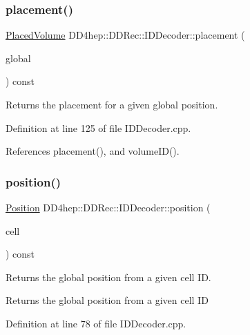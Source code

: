 \subsubsection{\texorpdfstring{placement()}{placement()}\hspace{0.1cm}{\footnotesize\ttfamily [2/2]}}
{\footnotesize\ttfamily \hyperlink{class_d_d4hep_1_1_geometry_1_1_placed_volume}{Placed\+Volume} D\+D4hep\+::\+D\+D\+Rec\+::\+I\+D\+Decoder\+::placement (\begin{DoxyParamCaption}\item[{const \hyperlink{namespace_d_d4hep_1_1_geometry_a55083902099d03506c6db01b80404900}{Geometry\+::\+Position} \&}]{global }\end{DoxyParamCaption}) const}



Returns the placement for a given global position. 



Definition at line 125 of file I\+D\+Decoder.\+cpp.



References placement(), and volume\+I\+D().

\hypertarget{class_d_d4hep_1_1_d_d_rec_1_1_i_d_decoder_a6efa19e0bd4211d9c34c437fc80c15c7}{}\label{class_d_d4hep_1_1_d_d_rec_1_1_i_d_decoder_a6efa19e0bd4211d9c34c437fc80c15c7} 
\subsubsection{\texorpdfstring{position()}{position()}}
{\footnotesize\ttfamily \hyperlink{namespace_d_d4hep_1_1_geometry_a55083902099d03506c6db01b80404900}{Position} D\+D4hep\+::\+D\+D\+Rec\+::\+I\+D\+Decoder\+::position (\begin{DoxyParamCaption}\item[{const \hyperlink{namespace_d_d4hep_1_1_d_d_rec_af5cecc2e566eeaedb430b92df23971d4}{Cell\+ID} \&}]{cell }\end{DoxyParamCaption}) const}



Returns the global position from a given cell ID. 

Returns the global position from a given cell ID 

Definition at line 78 of file I\+D\+Decoder.\+cpp.



